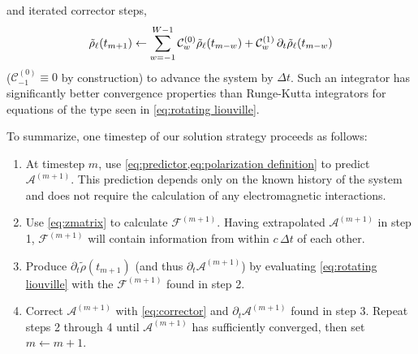 and iterated corrector steps,
\begin{equation}
    \tilde{\rho}_\ell(t_{m + 1}) \leftarrow \sum_{w = -1}^{W - 1} \mathcal{C}_w^{\qty(0)} \tilde{\rho}_\ell(t_{m-w}) + \mathcal{C}_w^{\qty(1)} \, \partial_t \tilde{\rho}_\ell(t_{m-w})
  \label{eq:corrector}
\end{equation}
($\mathcal{C}_{-1}^{(0)} \equiv 0$ by construction) to advance the system by $\Delta t$.
Such an integrator has significantly better convergence properties than Runge-Kutta integrators for equations of the type seen in \cref{eq:rotating liouville}.

To summarize, one timestep of our solution strategy proceeds as follows:
\begin{enumerate}
  \item At timestep $m$, use \cref{eq:predictor,eq:polarization definition} to predict $\mathcal{A}^{(m + 1)}$.
    This prediction depends only on the known history of the system and does not require the calculation of any electromagnetic interactions.
  \item Use \cref{eq:zmatrix} to calculate $\mathcal{F}^{(m + 1)}$.
    Having extrapolated $\mathcal{A}^{(m + 1)}$ in step 1, $\mathcal{F}^{(m + 1)}$ will contain information from \qds{} within $c \, \Delta t$ of each other.
  \item Produce $\partial_t \tilde{\rho}(t_{m + 1})$ (and thus $\partial_t \mathcal{A}^{(m + 1)}$) by evaluating \cref{eq:rotating liouville} with the $\mathcal{F}^{(m+1)}$ found in step 2.
  \item Correct $\mathcal{A}^{(m + 1)}$ with \cref{eq:corrector} and $\partial_t \mathcal{A}^{(m + 1)}$ found in step 3.
    Repeat steps 2 through 4 until $\mathcal{A}^{(m + 1)}$ has sufficiently converged, then set $m \leftarrow m + 1$.
\end{enumerate}
